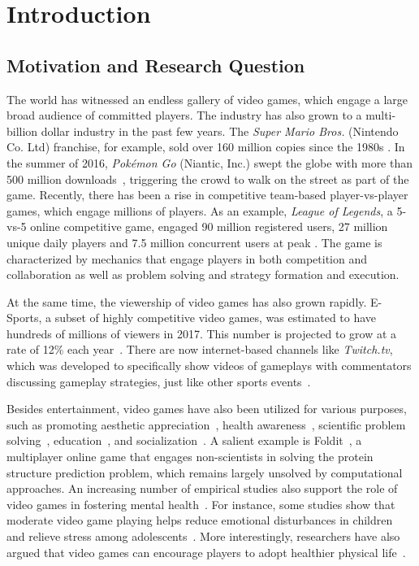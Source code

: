 
\chapter{Introduction} %

\label{chapter:intro} 

\section{Motivation and Research Question}\label{chap1:motiv}

The world has witnessed an endless gallery of video games, which engage a large broad audience of committed players. The industry has also grown to a multi-billion dollar industry in the past few years. The \textit{Super Mario Bros.}  (Nintendo Co. Ltd) franchise, for example, sold over 160 million copies since the 1980s \citep{mariosale}. In the summer of 2016, \textit{Pok\'{e}mon Go} (Niantic, Inc.) swept the globe with more than 500 million downloads~\citep{pokemongo}, triggering the crowd to walk on the street as part of the game. Recently, there has been a rise in competitive team-based player-vs-player games, which engage millions of players. As an example, \textit{League of Legends}, a 5-vs-5 online competitive game, engaged 90 million registered users, 27 million unique daily players and 7.5 million concurrent users at peak \citep{lol_fanbase,lol_27million}. The game is characterized by mechanics that engage players in both competition and collaboration as well as problem solving and strategy formation and execution. 

At the same time, the viewership of video games has also grown rapidly. E-Sports, a subset of highly competitive video games, was estimated to have hundreds of millions of viewers in 2017. This number is projected to grow at a rate of 12\% each year~\citep{superdata2017}. There are now internet-based channels like \textit{Twitch.tv}, which was developed to specifically show videos of gameplays with commentators discussing gameplay strategies, just like other sports events~\citep{superdata2017stream}.  

Besides entertainment, video games have also been utilized for various purposes, such as promoting aesthetic appreciation~\citep{jarvinen2008understanding}, health awareness~\citep{shiyko2016effects}, scientific problem solving~\citep{cooper2010predicting}, education~\citep{gee2003video}, and socialization~\citep{ferguson2013friends}. A salient example is Foldit~\citep{cooper2010predicting}, a multiplayer online game that engages non-scientists in solving the protein structure prediction problem, which remains largely unsolved by computational approaches. An increasing number of empirical studies also support the role of video games in fostering mental health~\citep{jones2014gaming}. For instance, some studies show that moderate video game playing helps reduce emotional disturbances in children~\citep{hull2009computer} and relieve stress among adolescents~\citep{colwell2007needs}. More interestingly, researchers have also argued that video games can encourage players to adopt healthier physical life~\citep{shiyko2016effects}. 

